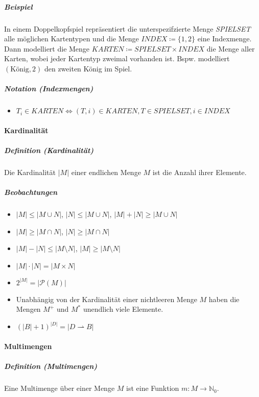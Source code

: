 \documentclass[a4paper, 11pt, accentcolor = tud3b]{tudreport}
\newcommand{\abs}[1]{\ensuremath{{\lvert #1 \rvert}}}
\newcommand{\definition}[2]{\subparagraph{Definition (#1)} #2}
\newcommand{\notation}[2]{\subparagraph{Notation (#1)} #2}
\begin{document}
			    \subparagraph{Beispiel}
			    In einem Doppelkopfspiel repräsentiert die unterspezifzierte Menge \textit{SPIELSET} alle möglichen Kartentypen und die Menge $ \textit{INDEX} \coloneqq \{ 1, 2 \} $ eine Indexmenge. Dann modelliert die Menge $ \textit{KARTEN} \coloneqq \textit{SPIELSET} \times \textit{INDEX} $ die Menge aller Karten, wobei jeder Kartentyp zweimal vorhanden ist. Bspw. modelliert $ (\text{König}, 2) $ den zweiten König im Spiel.
			    
			    \notation{Indexmengen}{
				    \begin{itemize}
				    	\item $ T _ i \in \textit{KARTEN} \iff (T, i) \in \textit{KARTEN}, T \in \textit{SPIELSET}, i \in \textit{INDEX} $
				    \end{itemize}
				}
		    
		    \paragraph{Kardinalität}
			    \definition{Kardinalität}{Die Kardinalität $ \abs{M} $ einer endlichen Menge $ M $ ist die Anzahl ihrer Elemente.}
			    
			    \subparagraph{Beobachtungen}
			    \begin{itemize}
			    	\item $ \abs{M} \leq \abs{M \cup N} $, $ \abs{N} \leq \abs{M \cup N} $, $ \abs{M} + \abs{N} \geq \abs{M \cup N} $
			    	\item $ \abs{M} \geq \abs{M \cap N} $, $ \abs{N} \geq \abs{M \cap N} $
			    	\item $ \abs{M} - \abs{N} \leq \abs{M \setminus N} $, $ \abs{M} \geq \abs{M \setminus N} $
			    	\item $ \abs{M} \cdot \abs{N} = \abs{M \times N} $
			    	\item $ 2 ^ { \abs{M} } = \abs{\mathcal{P}(M)} $
			    	\item Unabhängig von der Kardinalität einer nichtleeren Menge $ M $ haben die Mengen $ M ^ + $ und $ M ^ * $ unendlich viele Elemente.
			    	\item $ (\abs{B} + 1) ^ \abs{D} = \abs{D \rightharpoonup B} $
			    \end{itemize}
		    
		    \paragraph{Multimengen}
			    \definition{Multimengen}{Eine Multimenge über einer Menge $ M $ ist eine Funktion $ m : M \rightarrow \mathbb{N} _ 0 $.}
			    
\end{document}
